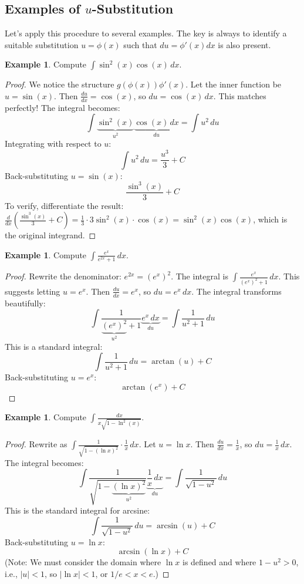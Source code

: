 \documentclass[11pt]{article}
\theoremstyle{definition}
\newtheorem{example}[theorem]{Example}
\theoremstyle{remark}
\begin{document}
\subsection{Examples of \texorpdfstring{$u$}{u}-Substitution}

Let's apply this procedure to several examples. The key is always to identify a suitable substitution $u = \phi(x)$ such that $du = \phi'(x) dx$ is also present.

\begin{example}
Compute $\int \sin^2(x) \cos(x) \, dx$.
\begin{proof}
We notice the structure $g(\phi(x)) \phi'(x)$. Let the inner function be $u = \sin(x)$.
Then $\frac{du}{dx} = \cos(x)$, so $du = \cos(x) \, dx$.
This matches perfectly! The integral becomes:
\[ \int \underbrace{\sin^2(x)}_{u^2} \underbrace{\cos(x) \, dx}_{du} = \int u^2 \, du \]
Integrating with respect to $u$:
\[ \int u^2 \, du = \frac{u^3}{3} + C \]
Back-substituting $u = \sin(x)$:
\[ \frac{\sin^3(x)}{3} + C \]
To verify, differentiate the result: $\frac{d}{dx} \left( \frac{\sin^3(x)}{3} + C \right) = \frac{1}{3} \cdot 3 \sin^2(x) \cdot \cos(x) = \sin^2(x) \cos(x)$, which is the original integrand.
\end{proof}
\end{example}

\begin{example}
Compute $\int \frac{e^x}{e^{2x}+1} \, dx$.
\begin{proof}
Rewrite the denominator: $e^{2x} = (e^x)^2$. The integral is $\int \frac{e^x}{(e^x)^2+1} \, dx$.
This suggests letting $u = e^x$.
Then $\frac{du}{dx} = e^x$, so $du = e^x \, dx$.
The integral transforms beautifully:
\[ \int \frac{1}{\underbrace{(e^x)^2}_{u^2}+1} \underbrace{e^x \, dx}_{du} = \int \frac{1}{u^2+1} \, du \]
This is a standard integral:
\[ \int \frac{1}{u^2+1} \, du = \arctan(u) + C \]
Back-substituting $u = e^x$:
\[ \arctan(e^x) + C \]
\end{proof}
\end{example}

\begin{example}
Compute $\int \frac{dx}{x\sqrt{1-\ln^2(x)}}$.
\begin{proof}
Rewrite as $\int \frac{1}{\sqrt{1-(\ln x)^2}} \cdot \frac{1}{x} \, dx$.
Let $u = \ln x$.
Then $\frac{du}{dx} = \frac{1}{x}$, so $du = \frac{1}{x} \, dx$.
The integral becomes:
\[ \int \frac{1}{\sqrt{1-\underbrace{(\ln x)^2}_{u^2}}} \underbrace{\frac{1}{x} \, dx}_{du} = \int \frac{1}{\sqrt{1-u^2}} \, du \]
This is the standard integral for arcsine:
\[ \int \frac{1}{\sqrt{1-u^2}} \, du = \arcsin(u) + C \]
Back-substituting $u = \ln x$:
\[ \arcsin(\ln x) + C \]
(Note: We must consider the domain where $\ln x$ is defined and where $1-u^2 > 0$, i.e., $|u|<1$, so $|\ln x| < 1$, or $1/e < x < e$.)
\end{proof}
\end{example}
\end{document}

